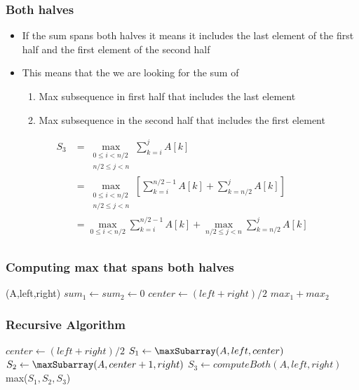 \documentclass{beamer}
\begin{document}
\begin{frame}
  \frametitle{Both halves}
  \begin{itemize}
  \item If the sum spans both halves it means it includes the last
    element of the first half and the first element of the second half
\item This means that the we are looking for the sum of
  \begin{enumerate}
  \item Max subsequence in first half that includes the last element
  \item Max subsequence in the second half that includes the first element
  \end{enumerate}
  \end{itemize}
  \begin{align*}
    S_3&=\max_{\substack{0\le i< n/2\\n/2\le j<n}}\sum_{k=i}^jA[k]\\
      &=\max_{\substack{0\le i<
          n/2\\n/2\le j<n}}\left[\sum_{k=i}^{n/2-1}A[k]+\sum_{k=n/2}^jA[k]\right]\\
      &=\max_{0\le i< n/2}\sum_{k=i}^{n/2-1}A[k]+\max_{n/2\le j<n}\sum_{k=n/2}^jA[k]\\
  \end{align*}
\end{frame}
\begin{frame}
  \frametitle{Computing max that spans both halves}
   \begin{function}[H]
 
  \DontPrintSemicolon
\computeBoth(A,left,right)
\BlankLine
  $sum_1\gets sum_2\gets 0$\;
  $center\gets (left+right)/2$\;
\Return $max_1+max_2$\;
\end{function}
\end{frame}
\begin{frame}
  \frametitle{Recursive Algorithm}
  \begin{function}[H]
 
  \DontPrintSemicolon
  \BlankLine
  $center\gets (left+right)/2$\;
  $S_1\gets \maxSubarray(A,left,center)$\;
  $S_2\gets \maxSubarray(A,center+1,right)$\;
  $S_3\gets computeBoth(A,left,right)$\;
  \Return max($S_1,S_2,S_3$)\;
\end{function}
\end{frame}
\end{document}

